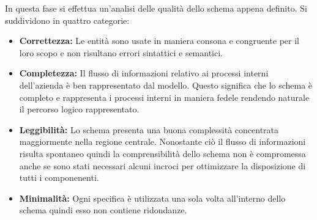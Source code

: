 In questa fase si effettua un'analisi delle qualità dello schema appena definito. Si suddividono in quattro categorie:
\begin{itemize}
\item \textbf{Correttezza:} Le entità sono usate in maniera consona e congruente per il loro scopo e non risultano errori sintattici e semantici.
\item \textbf{Completezza:} Il flusso di informazioni relativo ai processi interni dell'azienda è ben rappresentato dal modello. Questo significa che lo schema è completo e rappresenta i processi interni in maniera fedele rendendo naturale il percorso logico rappresentato.
\item \textbf{Leggibilità:} Lo schema presenta una buona complessità concentrata maggiormente nella regione centrale. Nonostante ciò il flusso di informazioni risulta spontaneo quindi la comprensibilità dello schema non è compromessa anche se sono stati necessari alcuni incroci per ottimizzare la disposizione di tutti i componenenti.
 \item \textbf{Minimalità:} Ogni specifica è utilizzata una sola volta all'interno dello schema quindi esso non contiene ridondanze.
\end{itemize}
